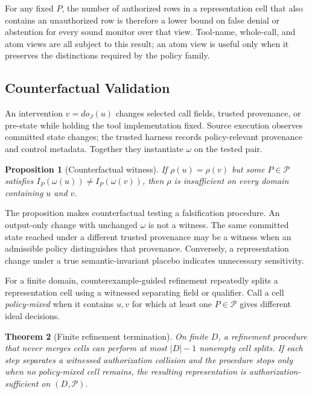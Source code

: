 \documentclass[letterpaper,twocolumn,10pt]{article}
\newtheorem{theorem}{Theorem}
\newtheorem{proposition}[theorem]{Proposition}
\theoremstyle{definition}
\begin{document}
For any fixed $P$, the number of authorized rows in a representation cell that
also contains an unauthorized row is therefore a lower bound on false denial
or abstention for every sound monitor over that view.  Tool-name, whole-call,
and atom views are all subject to this result; an atom view is useful only when
it preserves the distinctions required by the policy family.

\subsection{Counterfactual Validation}

An intervention $v=do_J(u)$ changes selected call fields, trusted provenance,
or pre-state while holding the tool implementation fixed.  Source execution
observes committed state changes; the trusted harness records policy-relevant
provenance and control metadata.  Together they instantiate $\omega$ on the
tested pair.

\begin{proposition}[Counterfactual witness]
\label{prop:mediation-gap}
If $\rho(u)=\rho(v)$ but some $P\in\mathcal P$ satisfies
$I_P(\omega(u))\ne I_P(\omega(v))$, then $\rho$ is insufficient on every domain
containing $u$ and $v$.
\end{proposition}

The proposition makes counterfactual testing a falsification procedure.  An
output-only change with unchanged $\omega$ is not a witness.  The same committed
state reached under a different trusted provenance may be a witness when an
admissible policy distinguishes that provenance.  Conversely, a representation
change under a true semantic-invariant placebo indicates unnecessary
sensitivity.

For a finite domain, counterexample-guided refinement repeatedly splits a
representation cell using a witnessed separating field or qualifier.  Call a
cell \emph{policy-mixed} when it contains $u,v$ for which at least one
$P\in\mathcal P$ gives different ideal decisions.

\begin{theorem}[Finite refinement termination]
\label{thm:finite-adequacy}
On finite $D$, a refinement procedure that never merges cells can perform at
most $|D|-1$ nonempty cell splits.  If each step separates a witnessed
authorization collision and the procedure stops only when no policy-mixed cell
remains, the resulting representation is authorization-sufficient on
$(D,\mathcal P)$.
\end{theorem}
\end{document}
